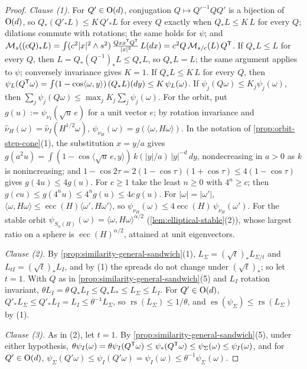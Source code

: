 \begin{proof}
\leanok
\emph{Clause (1).} For $Q' \in \mathrm{O}(d)$, conjugation $Q \mapsto Q'^{-1}QQ'$ is a bijection of $\mathrm{O}(d)$, so
$Q_*(Q'_*L) \le K\,Q'_*L$ for every $Q$ exactly when $Q_*L \le K\,L$ for every $Q$; dilations commute with
rotations; the same holds for $\psi$; and
$\mathcal M_s((cQ)_*L) = \int(c^2|x|^2 \wedge s^2)\,\frac{Qxx^{\mathsf{T}}Q^{\mathsf{T}}}{|x|^2}\,L(dx) = c^2Q\,\mathcal M_{s/c}(L)\,Q^{\mathsf{T}}$.
If $Q_*L \le L$ for every $Q$, then $L = Q_*(Q^{-1})_*L \le Q_*L$, so $Q_*L = L$; the same argument
applies to $\psi$; conversely invariance gives $K = 1$. If $Q_*L \le K\,L$ for every $Q$, then
$\psi_L(Q^{\mathsf{T}}\omega) = \int(1 - \cos\langle\omega,y\rangle)\,(Q_*L)(dy) \le K\,\psi_L(\omega)$. If
$\psi_j(Q\omega) \le K_j\psi_j(\omega)$, then $\sum_j\psi_j(Q\omega) \le \max_jK_j\sum_j\psi_j(\omega)$.
For the orbit, put $g(u) := \psi_{\nu_I}(\sqrt u\,e)$ for a unit vector $e$; by rotation invariance and
$\widehat\nu_H(\omega) = \widehat\nu_I(H^{1/2}\omega)$, $\psi_{\nu_H}(\omega) = g(\langle\omega,H\omega\rangle)$. In
the notation of \ref{prop:orbit-step-cone}(1), the substitution $x = y/a$ gives
$g(a^2u) = \int(1 - \cos\langle\sqrt u\,e,y\rangle)\,k(|y|/a)\,|y|^{-d}\,dy$, nondecreasing in $a > 0$ as $k$
is nonincreasing; and $1 - \cos 2\tau = 2(1 - \cos\tau)(1 + \cos\tau) \le 4(1 - \cos\tau)$ gives
$g(4u) \le 4g(u)$. For $c \ge 1$ take the least $n \ge 0$ with $4^n \ge c$; then
$g(cu) \le g(4^nu) \le 4^ng(u) \le 4c\,g(u)$. For $|\omega| = |\omega'|$, $\langle\omega,H\omega\rangle \le
\operatorname{ecc}(H)\langle\omega',H\omega'\rangle$, so $\psi_{\nu_H}(\omega) \le 4\operatorname{ecc}(H)\,\psi_{\nu_H}(\omega')$. For the stable
orbit $\psi_{S_\alpha(H)}(\omega) = \langle\omega,H\omega\rangle^{\alpha/2}$ (\ref{lem:elliptical-stable}(2)), whose
largest ratio on a sphere is $\operatorname{ecc}(H)^{\alpha/2}$, attained at unit eigenvectors.

\emph{Clause (2).} By \ref{prop:similarity-general-sandwich}(1), $L_\Sigma = (\sqrt t)_*L_{\Sigma/t}$ and
$L_{tI} = (\sqrt t)_*L_I$, and by (1) the spreads do not change under $(\sqrt t)_*$; so let $t = 1$.
With $Q$ as in \ref{prop:similarity-general-sandwich}(5) and $L_I$ rotation invariant,
$\theta L_I = \theta\,Q_*L_I \le Q_*L_* \le L_\Sigma \le L_I$. For $Q' \in \mathrm{O}(d)$,
$Q'_*L_\Sigma \le Q'_*L_I = L_I \le \theta^{-1}L_\Sigma$, so $\operatorname{rs}(L_\Sigma) \le 1/\theta$, and
$\operatorname{es}(\psi_\Sigma) \le \operatorname{rs}(L_\Sigma)$ by (1).

\emph{Clause (3).} As in (2), let $t = 1$. By \ref{prop:similarity-general-sandwich}(5), under either
hypothesis, $\theta\psi_I(\omega) = \theta\psi_I(Q^{\mathsf{T}}\omega) \le \psi_*(Q^{\mathsf{T}}\omega) \le \psi_\Sigma(\omega) \le
\psi_I(\omega)$, and for $Q' \in \mathrm{O}(d)$, $\psi_\Sigma(Q'\omega) \le \psi_I(Q'\omega) = \psi_I(\omega) \le
\theta^{-1}\psi_\Sigma(\omega)$.


\end{proof}
